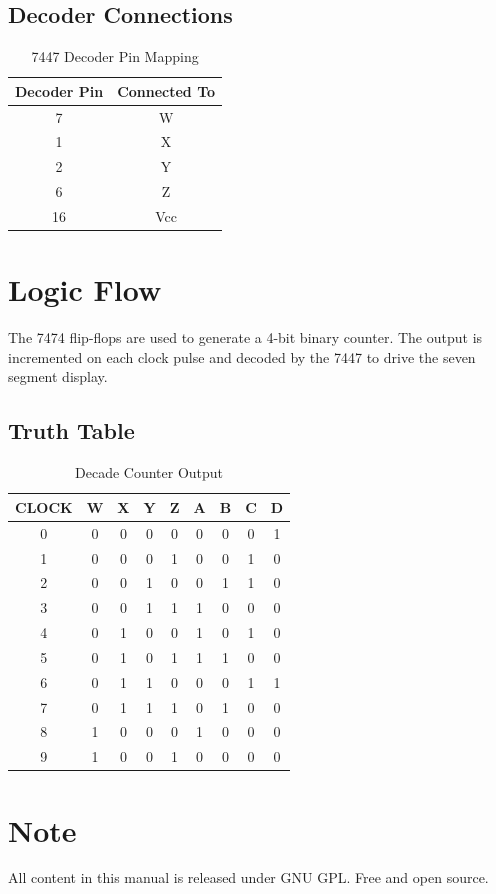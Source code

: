 \documentclass[12pt]{article}
\begin{document}
\subsection{Decoder Connections}
\begin{table}[h!]
\centering
\begin{tabular}{|c|c|}
\hline
\textbf{Decoder Pin} & \textbf{Connected To} \\
\hline
7 & W \\
1 & X \\
2 & Y \\
6 & Z \\
16 & Vcc \\
\hline
\end{tabular}
\caption{7447 Decoder Pin Mapping}
\end{table}

\section{Logic Flow}
The 7474 flip-flops are used to generate a 4-bit binary counter. The output is incremented on each clock pulse and decoded by the 7447 to drive the seven segment display.

\subsection{Truth Table}
\begin{table}[h!]
\centering
\begin{tabular}{|c|c|c|c|c|c|c|c|c|}
\hline
CLOCK & W & X & Y & Z & A & B & C & D \\
\hline
0 & 0 & 0 & 0 & 0 & 0 & 0 & 0 & 1 \\
1 & 0 & 0 & 0 & 1 & 0 & 0 & 1 & 0 \\
2 & 0 & 0 & 1 & 0 & 0 & 1 & 1 & 0 \\
3 & 0 & 0 & 1 & 1 & 1 & 0 & 0 & 0 \\
4 & 0 & 1 & 0 & 0 & 1 & 0 & 1 & 0 \\
5 & 0 & 1 & 0 & 1 & 1 & 1 & 0 & 0 \\
6 & 0 & 1 & 1 & 0 & 0 & 0 & 1 & 1 \\
7 & 0 & 1 & 1 & 1 & 0 & 1 & 0 & 0 \\
8 & 1 & 0 & 0 & 0 & 1 & 0 & 0 & 0 \\
9 & 1 & 0 & 0 & 1 & 0 & 0 & 0 & 0 \\
\hline
\end{tabular}
\caption{Decade Counter Output}
\end{table}

\section*{Note}
All content in this manual is released under GNU GPL. Free and open source.
\end{document}
